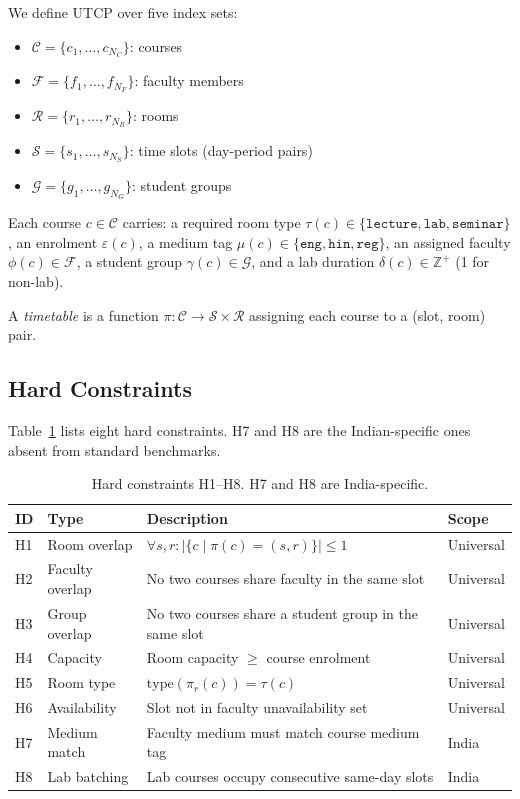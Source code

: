 \documentclass[conference]{IEEEtran}
\begin{document}
We define UTCP over five index sets:

\begin{itemize}
  \item $\mathcal{C} = \{c_1, \ldots, c_{N_C}\}$: courses
  \item $\mathcal{F} = \{f_1, \ldots, f_{N_F}\}$: faculty members
  \item $\mathcal{R} = \{r_1, \ldots, r_{N_R}\}$: rooms
  \item $\mathcal{S} = \{s_1, \ldots, s_{N_S}\}$: time slots (day-period pairs)
  \item $\mathcal{G} = \{g_1, \ldots, g_{N_G}\}$: student groups
\end{itemize}

Each course $c \in \mathcal{C}$ carries: a required room type $\tau(c) \in \{\texttt{lecture}, \texttt{lab}, \texttt{seminar}\}$, an enrolment $\varepsilon(c)$, a medium tag $\mu(c) \in \{\texttt{eng}, \texttt{hin}, \texttt{reg}\}$, an assigned faculty $\phi(c) \in \mathcal{F}$, a student group $\gamma(c) \in \mathcal{G}$, and a lab duration $\delta(c) \in \mathbb{Z}^+$ (1 for non-lab).

A \emph{timetable} is a function $\pi: \mathcal{C} \rightarrow \mathcal{S} \times \mathcal{R}$ assigning each course to a (slot, room) pair.

\subsection{Hard Constraints}

Table~\ref{tab:hard} lists eight hard constraints. H7 and H8 are the Indian-specific ones absent from standard benchmarks.

\begin{table}[ht]
\centering
\caption{Hard constraints H1--H8. H7 and H8 are India-specific.}
\label{tab:hard}
\begin{tabularx}{\linewidth}{ll>{\raggedright\arraybackslash}Xl}
\toprule
\textbf{ID} & \textbf{Type} & \textbf{Description} & \textbf{Scope} \\
\midrule
H1 & Room overlap    & $\forall s, r: |\{c \mid \pi(c)=(s,r)\}| \leq 1$ & Universal \\
H2 & Faculty overlap & No two courses share faculty in the same slot & Universal \\
H3 & Group overlap   & No two courses share a student group in the same slot & Universal \\
H4 & Capacity        & Room capacity $\geq$ course enrolment & Universal \\
H5 & Room type       & $\text{type}(\pi_r(c)) = \tau(c)$ & Universal \\
H6 & Availability    & Slot not in faculty unavailability set & Universal \\
H7 & Medium match    & Faculty medium must match course medium tag & India \\
H8 & Lab batching    & Lab courses occupy consecutive same-day slots & India \\
\bottomrule
\end{tabularx}
\end{table}
\end{document}
